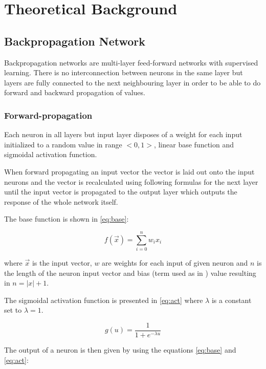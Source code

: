 \section{Theoretical Background}
\label{sec:theory}

\subsection{Backpropagation Network}
Backpropagation networks are multi-layer feed-forward networks with supervised learning. There is no interconnection between neurons in the same layer but layers are fully connected to the next neighbouring layer in order to be able to do forward and backward propagation of values.

\subsubsection{Forward-propagation}
Each neuron in all layers but input layer disposes of a weight for each input initialized to a random value in range $<0,1>$, linear base function and sigmoidal activation function.

When forward propagating an input vector the vector is laid out onto the input neurons and the vector is recalculated using following formulas for the next layer until the input vector is propagated to the output layer which outputs the response of the whole network itself.

The base function is shown in \ref{eq:base}:

\begin{equation}
    f(\vec{x}) =\sum_{i = 0}^{n} w_i x_i
    \label{eq:base}
\end{equation}

where $ \vec{x} $ is the input vector, $ w $ are weights for each input of given neuron and $ n $ is the length of the neuron input vector and bias (term used as in \cite{deeplearning}\cite{elements}) value resulting in $ n = |x| + 1$.

The sigmoidal activation function is presented in \ref{eq:act} where $ \lambda $ is a constant set to $ \lambda = 1 $.

\begin{equation}
    g(u) = \frac{1}{1 + e^{-\lambda u}}
    \label{eq:act}
\end{equation}

The output of a neuron is then given by using the equations \ref{eq:base} and \ref{eq:act}:

